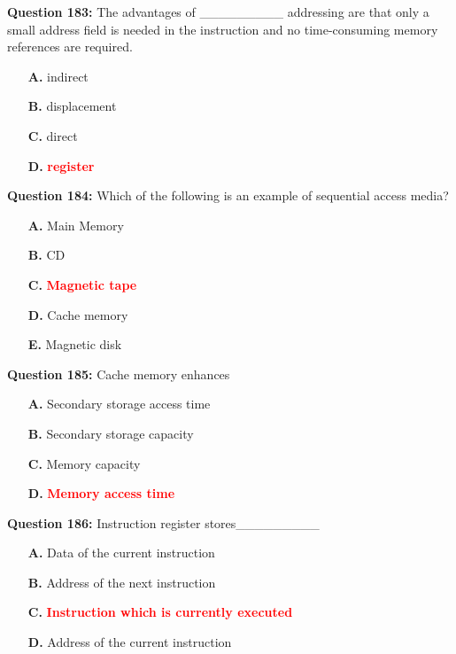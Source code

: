 \documentclass[12pt,a4paper]{article}
\begin{document}
\vspace{0.5cm}

\textbf{Question 183:} The advantages of _________ addressing are that only a small address field is needed in the instruction and no time-consuming memory references are required.

\begin{itemize}
    \item[\textbf{A.}] indirect
    \item[\textbf{B.}] displacement
    \item[\textbf{C.}] direct
    \item[\textbf{D.}] \textcolor{red}{\textbf{register}}
\end{itemize}

\vspace{0.5cm}

\textbf{Question 184:} Which of the following is an example of sequential access media?

\begin{itemize}
    \item[\textbf{A.}] Main Memory
    \item[\textbf{B.}] CD
    \item[\textbf{C.}] \textcolor{red}{\textbf{Magnetic tape}}
    \item[\textbf{D.}] Cache memory
    \item[\textbf{E.}] Magnetic disk
\end{itemize}

\vspace{0.5cm}

\textbf{Question 185:} Cache memory enhances

\begin{itemize}
    \item[\textbf{A.}] Secondary storage access time
    \item[\textbf{B.}] Secondary storage capacity
    \item[\textbf{C.}] Memory capacity
    \item[\textbf{D.}] \textcolor{red}{\textbf{Memory access time}}
\end{itemize}

\vspace{0.5cm}

\textbf{Question 186:} Instruction register stores_________

\begin{itemize}
    \item[\textbf{A.}] Data of the current instruction
    \item[\textbf{B.}] Address of the next instruction
    \item[\textbf{C.}] \textcolor{red}{\textbf{Instruction which is currently executed}}
    \item[\textbf{D.}] Address of the current instruction
\end{itemize}
\end{document}
